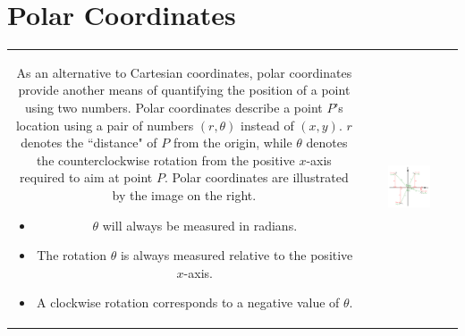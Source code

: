 \documentclass{article}
\begin{document}
\section*{Polar Coordinates}

\begin{tabular}{cc}
\parbox{0.5\textwidth}{
As an alternative to Cartesian coordinates, polar coordinates provide another means of quantifying the position of a point using two numbers. Polar coordinates describe a point \(P\)'s location using a pair of numbers \((r, \theta)\) instead of \((x, y)\). \(r\) denotes the ``distance" of \(P\) from the origin, while \(\theta\) denotes the counterclockwise rotation from the positive \(x\)-axis required to aim at point \(P\). Polar coordinates are illustrated by the image on the right.
\begin{itemize}
\item \(\theta\) will always be measured in radians. 
\item The rotation \(\theta\) is always measured relative to the positive \(x\)-axis.
\item A clockwise rotation corresponds to a negative value of \(\theta\).
\end{itemize} 
} & \parbox{0.5\textwidth}{
\includegraphics[width = 0.5\textwidth]{cartesian_vs_polar_coordinates}
}
\end{tabular}
\end{document}
